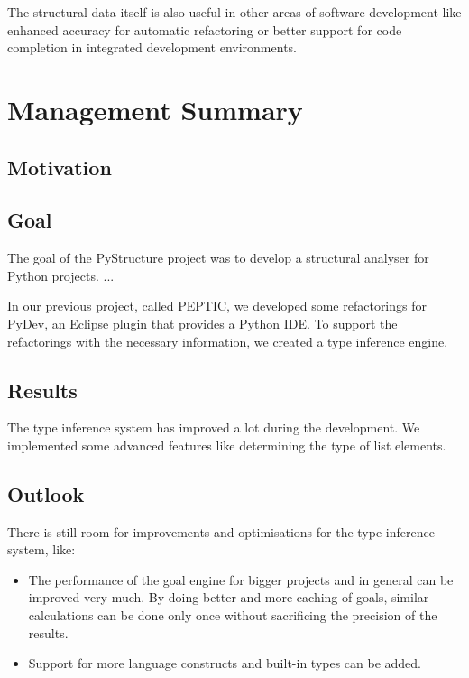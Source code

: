 \documentclass[12pt,halfparskip,DIV11,BCOR10mm]{scrreprt}
\begin{document}
The structural data itself is also useful in other areas of software development like enhanced accuracy for automatic refactoring or better support for code completion in integrated development environments.



\chapter*{Management Summary}

\section*{Motivation}


\section*{Goal}

The goal of the PyStructure project was to develop a structural analyser for Python projects. ...

In our previous project, called PEPTIC, we developed some refactorings for PyDev, an Eclipse plugin that provides a Python IDE. To support the refactorings with the necessary information, we created a type inference engine.

\section*{Results}

The type inference system has improved a lot during the development. We implemented some advanced features like determining the type of list elements.

\section*{Outlook}

There is still room for improvements and optimisations for the type inference system, like:

\begin{itemize}
    \item The performance of the goal engine for bigger projects and in general can be improved very much. By doing better and more caching of goals, similar calculations can be done only once without sacrificing the precision of the results.
    \item Support for more language constructs and built-in types can be added.
\end{itemize}
\end{document}
